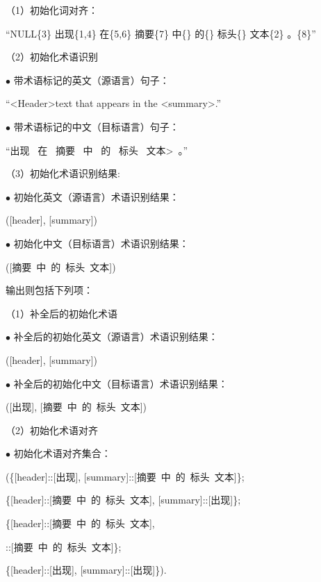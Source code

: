 \begin{center}
	\begin{boxedminipage}[h]{\linewidth}
		\small
		\quad （1）初始化词对齐：
		
		 \qquad\qquad\qquad ``NULL\{3\} 出现\{1,4\} 在\{5,6\} 摘要\{7\} 中\{\} 的\{\} 标头\{\} 文本\{2\} 。\{8\}''
		
		\quad（2）初始化术语识别 
		
		\qquad \qquad $\bullet$ 带术语标记的英文（源语言）句子：
		
		\qquad\qquad\qquad ``\textless Header\textgreater \space text that appears in the \textless summary\textgreater \space.'' 
		
		\qquad \qquad $\bullet$ 带术语标记的中文（目标语言）句子：
		
		\qquad\qquad\qquad ``出现 \  在 \ 摘要 \ 中 \ 的 \ 标头 \ 文本\textgreater \ 。''
		
		\quad （3）初始化术语识别结果:
		
		\qquad \qquad $\bullet$ 初始化英文（源语言）术语识别结果：
		
		\qquad\qquad\qquad ([header], [summary])
		
		\qquad \qquad $\bullet$ 初始化中文（目标语言）术语识别结果：
		
		\qquad\qquad\qquad ([摘要\ 中\ 的\ 标头\ 文本])
	\end{boxedminipage}
\end{center}

输出则包括下列项：

\begin{center}
	\begin{boxedminipage}[h]{\linewidth}
		\small
		\quad （1）补全后的初始化术语
		
		\qquad \qquad $\bullet$ 补全后的初始化英文（源语言）术语识别结果：
		
		\qquad\qquad\qquad ([header], [summary])
		
		\qquad \qquad $\bullet$ 补全后的初始化中文（目标语言）术语识别结果：
		
		\qquad\qquad\qquad ([出现], [摘要\ 中\ 的\ 标头\ 文本])
		
		\quad （2）初始化术语对齐
		
		\qquad \qquad $\bullet$ 初始化术语对齐集合：
		
		\qquad\qquad\qquad (\{[header]::[出现], [summary]::[摘要\ 中\ 的\ 标头\ 文本]\}; 
		
		\qquad\qquad\qquad \{[header]::[摘要\ 中\ 的\ 标头\ 文本], [summary]::[出现]\}; 
		
		\qquad\qquad\qquad \{[header]::[摘要\ 中\ 的\ 标头\ 文本], 
		
		\qquad\qquad\qquad\qquad [summary]::[摘要\ 中\ 的\ 标头\ 文本]\};
		
		\qquad\qquad\qquad \{[header]::[出现], [summary]::[出现]\}).
	\end{boxedminipage}
\end{center}

